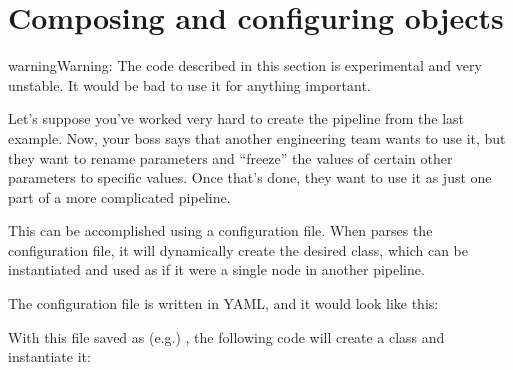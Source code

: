 \documentclass[letterpaper,10pt,english]{sphinxmanual}
\begin{document}
\section{Composing and configuring  objects}
\label{\detokenize{treehorn:composing-and-configuring-nanonode-objects}}
\begin{sphinxadmonition}{warning}{Warning:}
The code described in this section is experimental and very
unstable. It would be bad to use it for anything important.
\end{sphinxadmonition}

Let’s suppose you’ve worked very hard to create the pipeline from the
last example. Now, your boss says that another engineering team wants to
use it, but they want to rename parameters and “freeze” the values of
certain other parameters to specific values. Once that’s done, they want
to use it as just one part of a more complicated 
pipeline.

This can be accomplished using a configuration file. When 
parses the configuration file, it will dynamically create the desired
class, which can be instantiated and used as if it were a single node in
another pipeline.

The configuration file is written in YAML, and it would look like this:

%
\begin{sphinxVerbatim}[commandchars=\\\{\}]
 

    
     
       
       
    
     
     
\end{sphinxVerbatim}

With this file saved as (e.g.) , the following code
will create a  class and instantiate it:
\end{document}
